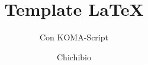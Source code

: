 \subject{Tipografia}
\title{Template \LaTeX}
\subtitle{Con KOMA-Script}
\author{Chichibio}
\date{\ISOToday ~ \thistime}